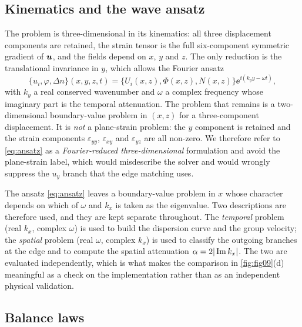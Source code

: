 \subsection{Kinematics and the wave ansatz}
\label{sec:governing_kinematics}

The problem is three-dimensional in its kinematics: all three displacement
components are retained, the strain tensor is the full six-component symmetric
gradient of $\boldsymbol{u}$, and the fields depend on $x$, $y$ and $z$.  The only
reduction is the translational invariance in $y$, which allows the
Fourier ansatz
\begin{equation}
\label{eq:ansatz}
\bigl\{u_i,\varphi,\Delta n\bigr\}(x,y,z,t)
=\bigl\{U_i(x,z),\Phi(x,z),N(x,z)\bigr\}\ee^{\ii(k_yy-\omega t)},
\end{equation}
with $k_y$ a real conserved wavenumber and $\omega$ a complex frequency whose
imaginary part is the temporal attenuation.  The problem that remains is a
two-dimensional boundary-value problem in $(x,z)$ for a three-component
displacement.  It is \emph{not} a plane-strain problem: the $y$ component is
retained and the strain components $\varepsilon_{yy}$, $\varepsilon_{xy}$ and
$\varepsilon_{yz}$ are all non-zero.  We therefore refer to
\eqref{eq:ansatz} as a \emph{Fourier-reduced three-dimensional} formulation and
avoid the plane-strain label, which would misdescribe the solver and would
wrongly suppress the $u_y$ branch that the edge matching uses.

The ansatz \eqref{eq:ansatz} leaves a boundary-value problem in $x$ whose
character depends on which of $\omega$ and $k_x$ is taken as the eigenvalue.
Two descriptions are therefore used, and they are kept separate throughout.
The \emph{temporal} problem (real $k_x$, complex $\omega$) is used to build the
dispersion curve and the group velocity; the \emph{spatial} problem (real
$\omega$, complex $k_x$) is used to classify the outgoing branches at the edge
and to compute the spatial attenuation $\alpha=2|\operatorname{Im} k_x|$.  The two are
evaluated independently, which is what makes the comparison in
\cref{fig:fig09}(d) meaningful as a check on the implementation rather than as
an independent physical validation.

\subsection{Balance laws}
\label{sec:governing_balance}

